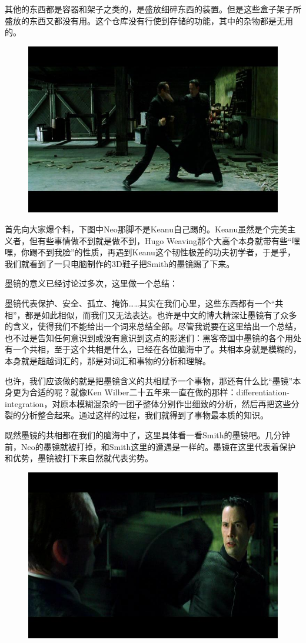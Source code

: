 \documentclass[UTF8]{ctexart}
\begin{document}
其他的东西都是容器和架子之类的，是盛放细碎东西的装置。但是这些盒子架子所盛放的东西又都没有用。这个仓库没有行使到存储的功能，其中的杂物都是无用的。

\begin{figure}[htb]
\centering
\includegraphics[width=0.5\linewidth]{fig/99518644ce3e804e500ffe4f.jpg}
\end{figure}

首先向大家爆个料，下图中Neo那脚不是Keanu自己踢的。Keanu虽然是个完美主义者，但有些事情做不到就是做不到，Hugo Weaving那个大高个本身就带有些“嘿嘿，你踢不到我脸”的性质，再遇到Keanu这个韧性极差的功夫初学者，于是乎，我们就看到了一只电脑制作的3D鞋子把Smith的墨镜踢了下来。

墨镜的意义已经讨论过多次，这里做一个总结：

墨镜代表保护、安全、孤立、掩饰……其实在我们心里，这些东西都有一个“共相”，都是如此相似，而我们又无法表达。也许是中文的博大精深让墨镜有了众多的含义，使得我们不能给出一个词来总结全部。尽管我说要在这里给出一个总结，也不过是告知任何意识到或没有意识到这点的影迷们：黑客帝国中墨镜的各个用处有一个共相，至于这个共相是什么，已经在各位脑海中了。共相本身就是模糊的，本身就是超越词汇的，那是对词汇和事物的分析和理解。

也许，我们应该做的就是把墨镜含义的共相赋予一个事物，那还有什么比“墨镜”本身更为合适的呢？就像Ken Wilber二十五年来一直在做的那样：differentiation-integration，对原本模糊混杂的一团子整体分别作出细致的分析，然后再把这些分裂的分析整合起来。通过这样的过程，我们就得到了事物最本质的知识。

既然墨镜的共相都在我们的脑海中了，这里具体看一看Smith的墨镜吧。几分钟前，Neo的墨镜就被打掉，和Smith这里的遭遇是一样的。墨镜在这里代表着保护和优势，墨镜被打下来自然就代表劣势。

\begin{figure}[htb]
\centering
\includegraphics[width=0.5\linewidth]{fig/251ccb80ad8918d49023d973.jpg}
\end{figure}
\end{document}
